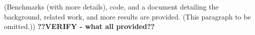 \documentclass[letterpaper]{article} %
\begin{document}
(Benchmarks (with more details), code, and a document detailing the background, related work, and more results are provided. (This paragraph to be omitted.)) 
\textbf{??VERIFY - what all provided??}




\end{document}
